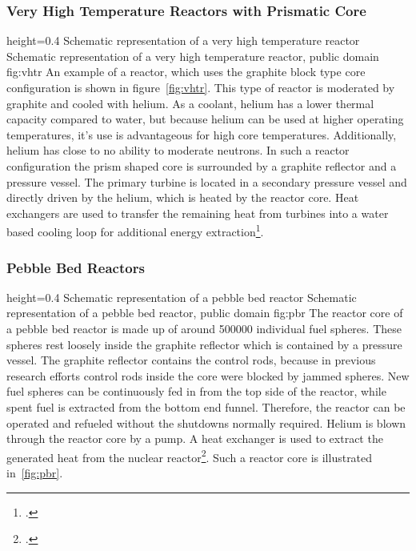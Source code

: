 \subsubsection{Very High Temperature Reactors with Prismatic Core}
    {height=0.4\textheight}
    {Schematic representation of a very high temperature reactor}
    {Schematic representation of a very high temperature reactor, public domain}
    {fig:vhtr}
An example of a reactor, which uses the graphite block type core configuration is shown in figure~\ref{fig:vhtr}.
This type of reactor is moderated by graphite and cooled with helium. As a coolant, helium has
a lower thermal capacity compared to water, but because helium can be used at higher operating
temperatures, it's use is advantageous for high core temperatures. Additionally, helium has close
to no ability to moderate neutrons. In such a reactor configuration
the prism shaped core is surrounded by a graphite reflector and a pressure vessel. The primary turbine
is located in a secondary pressure vessel and directly driven by the helium, which is heated by the
reactor core. Heat exchangers are used to transfer the remaining heat from turbines into a water based
cooling loop for additional energy extraction\footcite{VHTRTS}.
\subsubsection{Pebble Bed Reactors}\label{chap:pbr}
    {height=0.4\textheight}
    {Schematic representation of a pebble bed reactor}
    {Schematic representation of a pebble bed reactor, public domain}
    {fig:pbr}
The reactor core of a pebble bed reactor is made up of around 500000 individual fuel spheres. These
spheres rest loosely inside the graphite reflector which is contained by a pressure vessel. The graphite
reflector contains the control rods, because in previous research efforts control rods inside the core were blocked
by jammed spheres. New fuel spheres can be continuously fed in from the top side of the reactor, while
spent fuel is extracted from the bottom end funnel. Therefore, the reactor can be operated and refueled
without the shutdowns normally required. Helium is blown through the reactor core by a
pump. A heat exchanger is used to extract the generated heat from the nuclear reactor\footcite[60-62]{T4Gen}.
Such a reactor core is illustrated in~\ref{fig:pbr}.
